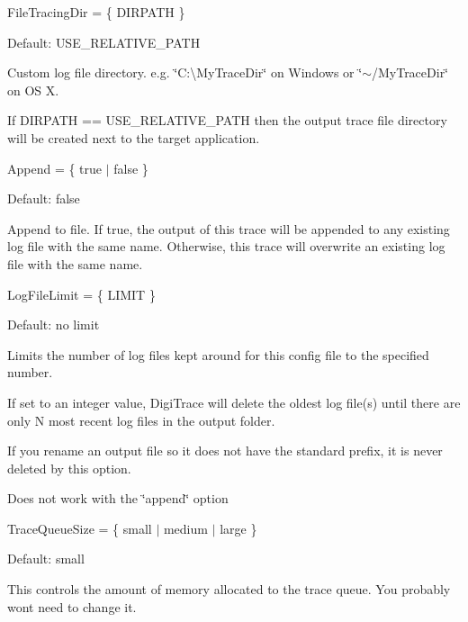 \begin{DoxyItemize}
\item {\ttfamily File\+Tracing\+Dir = \{ D\+I\+R\+P\+A\+TH \} } 
\begin{DoxyItemize}
\item Default\+: {\ttfamily U\+S\+E\+\_\+\+R\+E\+L\+A\+T\+I\+V\+E\+\_\+\+P\+A\+TH}  
\item Custom log file directory. e.\+g. \char`\"{}\+C\+:\textbackslash{}\+My\+Trace\+Dir\char`\"{} on Windows or \char`\"{}$\sim$/\+My\+Trace\+Dir\char`\"{} on OS X.  
\item If D\+I\+R\+P\+A\+TH == U\+S\+E\+\_\+\+R\+E\+L\+A\+T\+I\+V\+E\+\_\+\+P\+A\+TH then the output trace file directory will be created next to the target application.  
\end{DoxyItemize}
\item {\ttfamily Append = \{ true $\vert$ false \} } 
\begin{DoxyItemize}
\item Default\+: {\ttfamily false}  
\item Append to file. If {\ttfamily true}, the output of this trace will be appended to any existing log file with the same name. Otherwise, this trace will overwrite an existing log file with the same name.  
\end{DoxyItemize}
\item {\ttfamily Log\+File\+Limit = \{ L\+I\+M\+IT \} } 
\begin{DoxyItemize}
\item Default\+: no limit  
\item Limits the number of log files kept around for this config file to the specified number.  
\item If set to an integer value, Digi\+Trace will delete the oldest log file(s) until there are only N most recent log files in the output folder.  
\item If you rename an output file so it does not have the standard prefix, it is never deleted by this option.  
\item Does not work with the \char`\"{}append\char`\"{} option  
\end{DoxyItemize}
\item {\ttfamily Trace\+Queue\+Size = \{ small $\vert$ medium $\vert$ large \} } 
\begin{DoxyItemize}
\item Default\+: {\ttfamily small}  
\item This controls the amount of memory allocated to the trace queue. You probably won\textquotesingle{}t need to change it.  

\end{DoxyItemize}
\end{DoxyItemize}
